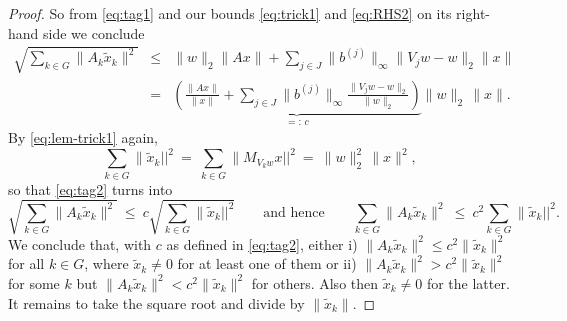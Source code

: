 \documentclass[10pt,a4paper]{amsart}
\begin{document}
\begin{proof}
So from \eqref{eq:tag1} and our bounds \eqref{eq:trick1} and \eqref{eq:RHS2} on its right-hand side we conclude
\begin{eqnarray}
\sqrt{\sum_{k\in G}\|A_k\tilde x_k\|^2} &\le& \|w\|_2\|Ax\| + \sum_{j\in J} \|b^{(j)}\|_\infty \|V_jw-w\|_2\|x\|\nonumber\\
&=& \underbrace{\left(\frac{\|Ax\|}{\|x\|} + \sum_{j\in J} \|b^{(j)}\|_\infty \frac{\|V_jw-w\|_2}{\|w\|_2}\right)}_{=:\,c}\|w\|_2\,\|x\|.\label{eq:tag2}
\end{eqnarray}
By \eqref{eq:lem-trick1} again, 
\[
\sum_{k\in G}\|\tilde x_k||^2\ =\ \sum_{k\in G}\|M_{V_kw}x||^2\ =\ \|w\|_2^2\,\|x\|^2,
\]
so that \eqref{eq:tag2} turns into
\[
\sqrt{\sum_{k\in G}\|A_k\tilde x_k\|^2} \ \le\ c\sqrt{\sum_{k\in G}\|\tilde x_k||^2}
\qquad\text{and hence}\qquad
\sum_{k\in G}\|A_k\tilde x_k\|^2 \ \le\ c^2\sum_{k\in G}\|\tilde x_k||^2.
\]
We conclude that, with $c$ as defined in \eqref{eq:tag2}, either i) $\|A_k\tilde x_k\|^2\le c^2\|\tilde x_k\|^2$ for all $k\in G$, where $\tilde x_k\ne 0$ for at least one of them or ii) $\|A_k\tilde x_k\|^2> c^2\|\tilde x_k\|^2$ for some $k$ but $\|A_k\tilde x_k\|^2< c^2\|\tilde x_k\|^2$ for others. Also then $\tilde x_k\ne 0$ for the latter. It remains to take the square root and divide by $\|\tilde x_k\|$.
\end{proof}
\end{document}
